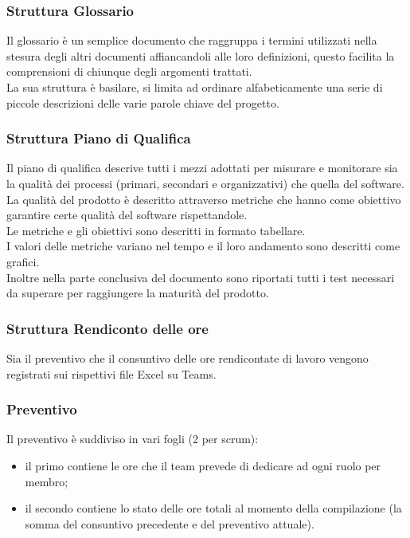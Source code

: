 \subsubsection{Struttura Glossario}
Il glossario è un semplice documento che raggruppa i termini utilizzati nella stesura degli altri documenti affiancandoli alle loro definizioni, questo facilita la comprensioni di chiunque degli argomenti trattati. \\ La sua struttura è basilare, si limita ad ordinare alfabeticamente una serie di piccole descrizioni delle varie parole chiave del progetto.

\subsubsection{Struttura Piano di Qualifica}

Il piano di qualifica descrive tutti i mezzi adottati per misurare e monitorare sia la qualità dei processi (primari, secondari e organizzativi) che quella del software.\\
La qualità del prodotto è descritto attraverso metriche che hanno come obiettivo garantire certe qualità del software rispettandole.\\
Le metriche e gli obiettivi sono descritti in formato tabellare.\\
I valori delle metriche variano nel tempo e il loro andamento sono descritti come grafici.\\
Inoltre nella parte conclusiva del documento sono riportati tutti i test necessari da superare per raggiungere la maturità del prodotto.


\subsubsection{Struttura Rendiconto delle ore}
Sia il preventivo che il consuntivo delle ore rendicontate di lavoro vengono registrati sui rispettivi file Excel su Teams.
\subsubsection*{Preventivo}
Il preventivo è suddiviso in vari fogli (2 per scrum):
\begin{itemize}
    \item il primo contiene le ore che il team prevede di dedicare ad ogni ruolo per membro;
    \item il secondo contiene lo stato delle ore totali al momento della compilazione (la somma del consuntivo precedente e del preventivo attuale).
\end{itemize}
